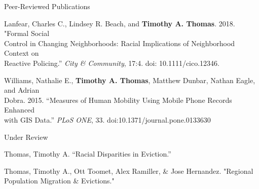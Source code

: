 \documentclass{resume} %
\begin{document}
\begin{rSection}{Peer-Reviewed Publications}
\vspace{5mm}

Lanfear, Charles C., Lindsey R. Beach, and \textbf{Timothy A. Thomas}. 2018. "Formal Social\\
Control in Changing Neighborhoods: Racial Implications of Neighborhood Context on\\
Reactive Policing.'' \textit{City \& Community}, 17:4. doi: 10.1111/cico.12346.

Williams, Nathalie E., \textbf{Timothy A. Thomas}, Matthew Dunbar, Nathan Eagle, and Adrian\\
Dobra. 2015. ``Measures of Human Mobility Using Mobile Phone Records Enhanced\\
with GIS Data.'' \textit{PLoS ONE}, 33. doi:10.1371/journal.pone.0133630
\vspace{5mm}
\end{rSection}


%

\begin{rSection}{Under Review}
\vspace{5mm}

Thomas, Timothy A. ``Racial Disparities in Eviction.''

Thomas, Timothy A., Ott Toomet, Alex Ramiller, \& Jose Hernandez. "Regional Population Migration \& Evictions."

\vspace{5mm}
\end{rSection}


%
\end{document}

